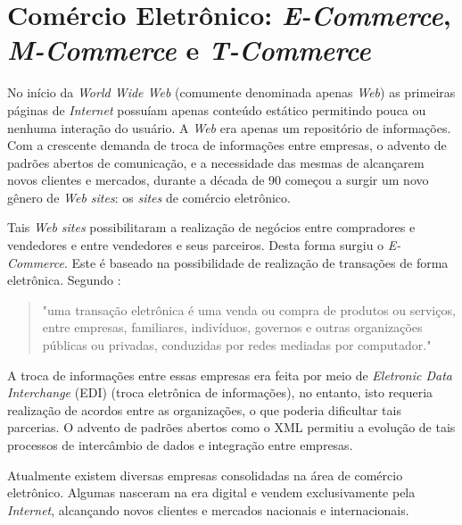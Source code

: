 \section{Comércio Eletrônico: \textit{E-Commerce}, \textit{M-Commerce} e \textit{T-Commerce}}

No início da \textit{World Wide Web} (comumente denominada apenas \textit{Web}) 
as primeiras páginas de \textit{Internet} possuíam apenas conteúdo estático permitindo pouca ou nenhuma interação
do usuário. A \textit{Web} era apenas um repositório de informações. Com a crescente demanda de troca
de informações entre empresas, o advento de padrões abertos de comunicação, 
e a necessidade das mesmas de alcançarem novos clientes e mercados, durante a década de 90 
começou a surgir um novo gênero de \textit{Web sites}: os \textit{sites} de comércio eletrônico\cite{chu2007evolution}.

Tais \textit{Web sites} possibilitaram a realização de negócios entre compradores e vendedores
e entre vendedores e seus parceiros. Desta forma surgiu o \textit{E-Commerce}. Este é baseado na possibilidade
de realização de transações de forma eletrônica. Segundo \cite{veijalainen2006transaction}:

\begin{quote} 
"uma transação eletrônica
é uma venda ou compra de produtos ou serviços, entre empresas, familiares, indivíduos, governos e outras organizações
públicas ou privadas, conduzidas por redes mediadas por computador."
\end{quote}

A troca de informações entre essas empresas era feita por meio de \textit{Eletronic Data Interchange} (EDI) (troca eletrônica de informações), no entanto, isto requeria realização de acordos entre as organizações\cite{chu2007evolution},
o que poderia dificultar tais parcerias. O advento de padrões abertos como o XML permitiu a evolução
de tais processos de intercâmbio de dados e integração entre empresas.

Atualmente existem diversas empresas consolidadas na área de comércio eletrônico. Algumas nasceram na era digital
e vendem exclusivamente pela \textit{Internet}, alcançando
novos clientes e mercados nacionais e internacionais.

